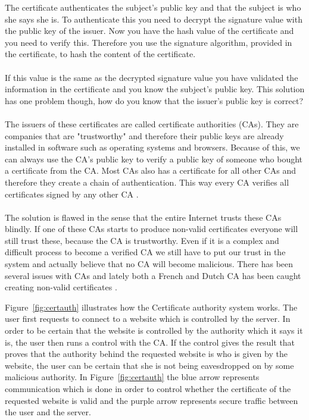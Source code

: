 \documentclass[frame, english]{idamasterthesis}
\begin{document}
\noindent
The certificate authenticates the subject's public key and that the subject is who she says she is. To authenticate this you need to decrypt the signature value with the public key of the issuer. Now you have the hash value of the certificate and you need to verify this. Therefore you use the signature algorithm, provided in the certificate, to hash the content of the certificate.\\\\
If this value is the same as the decrypted signature value you have validated the information in the certificate and you know the subject's public key. This solution has one problem though, how do you know that the issuer's public key is correct? \\\\
The issuers of these certificates are called certificate authorities (CAs). They are companies that are "trustworthy" and therefore their public keys are already installed in software such as operating systems and browsers. Because of this, we can always use the CA's public key to verify a public key of someone who bought a certificate from the CA. Most CAs also has a certificate for all other CAs and therefore they create a chain of authentication. This way every CA verifies all certificates signed by any other CA \cite{certificate}. \\\\
The solution is flawed in the sense that the entire Internet trusts these CAs blindly. If one of these CAs starts to produce non-valid certificates everyone will still trust these, because the CA is trustworthy. Even if it is a complex and difficult process to become a verified CA we still have to put our trust in the system and actually believe that no CA will become malicious. There has been several issues with CAs and lately both a French and Dutch CA has been caught creating non-valid certificates \cite{frenchCA,dutchCA}.

\pagebreak

\noindent
Figure~\ref{fig:certauth} illustrates how the Certificate authority system works. The user first requests to connect to a website which is controlled by the server. In order to be certain that the website is controlled by the authority which it says it is, the user then runs a control with the CA. If the control gives the result that proves that the authority behind the requested website is who is given by the website, the user can be certain that she is not being eavesdropped on by some malicious authority. In Figure~\ref{fig:certauth} the blue arrow represents communication which is done in order to control whether the certificate of the requested website is valid and the purple arrow represents secure traffic between the user and the server. 
\end{document}
